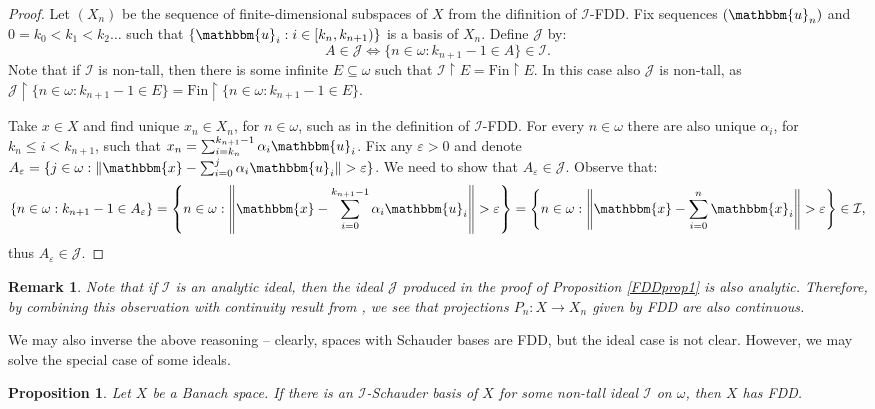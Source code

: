 \documentclass{amsart}
\newcommand{\I}{\mathcal{I}}
\newcommand{\J}{\mathcal{J}}
\newcommand{\Fin}{\mathrm{Fin}}
\newcommand{\w}{\mathbbm}
\newtheorem{proposition}[theorem]{Proposition}
\newtheorem{remark}[theorem]{Remark}
\begin{document}
\begin{proof}
Let $(X_n)$ be the sequence of finite-dimensional subspaces of $X$ from the difinition of $\I$-FDD. Fix sequences $(\w{u}_n)$ and $0=k_0<k_1<k_2\ldots$ such that $\{\w{u}_i : i \in [k_{n}, k_{n+1})\}$ is a basis of $X_n$. Define $\J$ by:
\[
A \in \J \Longleftrightarrow \{ n \in \omega : k_{n+1}-1 \in A \} \in \I.
\]
Note that if $\I$ is non-tall, then there is some infinite $E\subseteq\omega$ such that $\I\restriction E=\Fin\restriction E$. In this case also $\J$ is non-tall, as $\J\restriction\{n\in\omega:k_{n+1}-1 \in E\}=\Fin\restriction\{n\in\omega:k_{n+1}-1 \in E\}$.
    
Take $x \in X$ and find unique $x_n \in X_n$, for $n\in\omega$, such as in the definition of $\I$-FDD. For every $n\in\omega$ there are also unique $\alpha_i$, for $k_n\leq i<k_{n+1}$, such that $x_n = \sum_{i=k_n}^{k_{n+1}-1}\alpha_i \w{u}_i$. Fix any $\varepsilon>0$ and denote $A_\varepsilon = \{ j \in \omega : \|\w{x}-\sum_{i=0}^{j}\alpha_i \w{u}_i \|> \varepsilon\}$. We need to show that $A_\varepsilon \in\J$. Observe that:
    \[
    \{ n \in \omega : k_{n+1}-1 \in A_\varepsilon \} = \left\{ n \in \omega : \left\|\w{x}-\sum_{i=0}^{k_{n+1}-1}\alpha_i \w{u}_i \right\|> \varepsilon \right\} = \left\{ n \in \omega : \left\|\w{x}-\sum_{i=0}^{n}\w{x}_i \right\|> \varepsilon \right\} \in \I,
    \]
thus $A_\varepsilon \in \J$.
\end{proof}

\begin{remark}
Note that if $\I$ is an analytic ideal, then the ideal $\J$ produced in the proof of Proposition \ref{FDDprop1} is also analytic. Therefore, by combining this observation with continuity result from \cite{RKS}, we see that projections $P_n\colon X \to X_n$ given by FDD are also continuous. 
\end{remark}

We may also inverse the above reasoning -- clearly, spaces with Schauder bases are FDD, but the ideal case is not clear. However, we may solve the special case of some ideals.

\begin{proposition}
\label{FDDprop2}
Let $X$ be a Banach space. If there is an $\I$-Schauder basis of $X$ for some non-tall ideal $\I$ on $\omega$, then $X$ has FDD.
\end{proposition}
\end{document}
